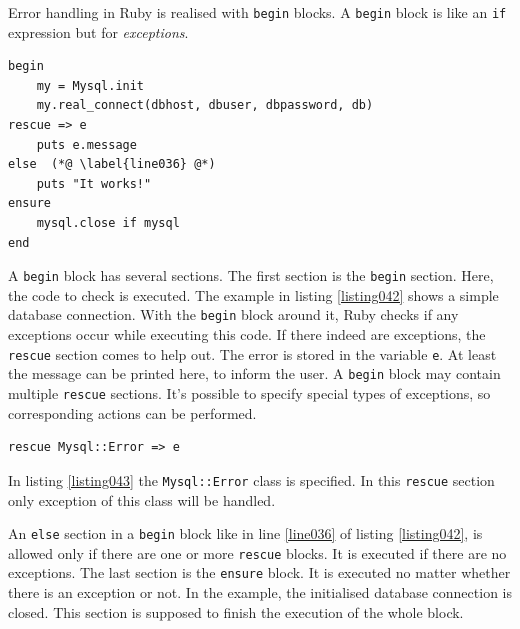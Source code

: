 Error handling in Ruby is realised with \lstinline{begin} blocks. A \lstinline{begin} block is like an \lstinline{if} expression but for \emph{exceptions}. 

\begin{lstlisting}[aboveskip=1\baselineskip, caption=Error handling with \lstinline{begin} blocks., label=listing042]
begin
	my = Mysql.init
	my.real_connect(dbhost, dbuser, dbpassword, db)
rescue => e
	puts e.message
else  (*@ \label{line036} @*)
	puts "It works!"
ensure
	mysql.close if mysql
end
\end{lstlisting}

A \lstinline{begin} block has several sections. The first section is the \lstinline{begin} section. Here, the code to check is executed. The example in listing \ref{listing042} shows a simple database connection. With the \lstinline{begin} block around it, Ruby checks if any exceptions occur while executing this code. If there indeed are exceptions, the \lstinline{rescue} section comes to help out. The error is stored in the variable \lstinline{e}. At least the message can be printed here, to inform the user. A \lstinline{begin} block may contain multiple \lstinline{rescue} sections. It's possible to specify special types of exceptions, so corresponding actions can be performed. 

\begin{lstlisting}[aboveskip=1\baselineskip, caption=\texttt{joomlaMultiple.rb} usage., label=listing043]
rescue Mysql::Error => e
\end{lstlisting}

In listing \ref{listing043} the \lstinline{Mysql::Error} class is specified. In this \lstinline{rescue} section only exception of this class will be handled.

An \lstinline{else} section in a \lstinline{begin} block like in line \ref{line036} of listing \ref{listing042}, is allowed only if there are one or more \lstinline{rescue} blocks. It is executed if there are no exceptions. The last section is the \lstinline{ensure} block. It is executed no matter whether there is an exception or not. In the example, the initialised database connection is closed. This section is supposed to finish the execution of the whole block. \cite{skorks}

